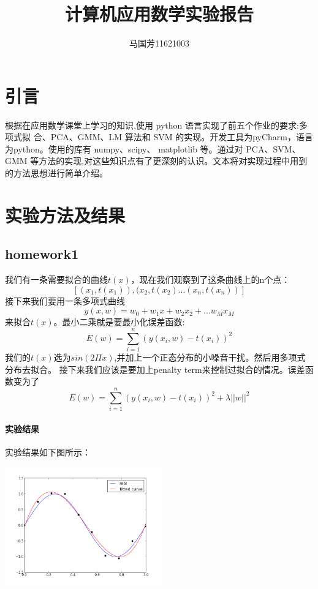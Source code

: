 \documentclass[10pt,a4paper]{article}
\theoremstyle{mythm}%
\numberwithin{equation}{section}
\begin{document}
\setlength{\abovedisplayskip}{1ex} %
\setlength{\belowdisplayskip}{1ex} %

\author{马国芳11621003}                                 %
\title{计算机应用数学实验报告}              %
\maketitle                                           %

\section{引言}
根据在应用数学课堂上学习的知识,使用 python 语言实现了前五个作业的要求:多项式拟 合、PCA、GMM、LM 算法和 SVM 的实现。开发工具为pyCharm，语言为python。使用的库有 numpy、scipy、 matplotlib 等。通过对 PCA、SVM、GMM 等方法的实现,对这些知识点有了更深刻的认识。文本将对实现过程中用到的方法思想进行简单介绍。
\section{实验方法及结果}
\subsection{homework1}
我们有一条需要拟合的曲线$t(x)$，现在我们观察到了这条曲线上的n个点：
$$[(x_1,t(x_1)),(x_2,t(x_2)...(x_n,t(x_n))]$$
接下来我们要用一条多项式曲线
$$y(x,w)=w_0+w_1x+w_2x_2+...w_Mx_M$$
来拟合$t(x)$。最小二乘就是要最小化误差函数:
$$E(w)=\sum_{i=1}^n(y(x_i,w)-t(x_i))^2$$
我们的$t(x)$选为$ sin(2\Pi x)$,并加上一个正态分布的小噪音干扰。然后用多项式分布去拟合。
接下来我们应该是要加上penalty term来控制过拟合的情况。误差函数变为了
$$E(w)=\sum_{i=1}^n(y(x_i,w)-t(x_i))^2+\lambda ||w||^2$$

 \paragraph{实验结果}实验结果如下图所示：

\includegraphics[height=2in]{figure1-1.png} 
\end{document}
